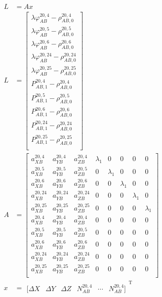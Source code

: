 \begin{align}
	L &= Ax \label{eq:21a} \\
	L &=
	\begin{bmatrix}
		\lambda \varphi_{AB}^{20,4}-\rho_{AB,0}^{20,4} \\[6pt]
		\lambda \varphi_{AB}^{20,5}-\rho_{AB,0}^{20,5} \\[6pt]
		\lambda \varphi_{AB}^{20,6}-\rho_{AB,0}^{20,6} \\[6pt]
		\lambda \varphi_{AB}^{20,24}-\rho_{AB,0}^{20,24} \\[6pt]
		\lambda \varphi_{AB}^{20,25}-\rho_{AB,0}^{20,25} \\[6pt]
		P_{AB,1}^{20,4}-\rho_{AB,0}^{20,4} \\[6pt]
		P_{AB,1}^{20,5}-\rho_{AB,0}^{20,5} \\[6pt]
		P_{AB,1}^{20,6}-\rho_{AB,0}^{20,6} \\[6pt]
		P_{AB,1}^{20,24}-\rho_{AB,0}^{20,24} \\[6pt]
		P_{AB,1}^{20,25}-\rho_{AB,0}^{20,25} \\
	\end{bmatrix} \label{eq:21b}\\
	A &= \left[\begin{matrix}
 a_{XB}^{20,4} &  a_{YB}^{20,4} &  a_{ZB}^{20,4} & \lambda_1 &         0 &         0 &         0 &         0\\[6pt]
 a_{XB}^{20,5} &  a_{YB}^{20,5} &  a_{ZB}^{20,5} &         0 & \lambda_1 &         0 &         0 &         0\\[6pt]
 a_{XB}^{20,6} &  a_{YB}^{20,6} &  a_{ZB}^{20,6} &         0 &         0 & \lambda_1 &         0 &         0\\[6pt]
a_{XB}^{20,24} & a_{YB}^{20,24} & a_{ZB}^{20,24} &         0 &         0 &         0 & \lambda_1 &         0\\[6pt]
a_{XB}^{20,25} & a_{YB}^{20,25} & a_{ZB}^{20,25} &         0 &         0 &         0 &         0 & \lambda_1\\[6pt]
 a_{XB}^{20,4} &  a_{YB}^{20,4} &  a_{ZB}^{20,4} &         0 &         0 &         0 &         0 &         0\\[6pt]
 a_{XB}^{20,5} &  a_{YB}^{20,5} &  a_{ZB}^{20,5} &         0 &         0 &         0 &         0 &         0\\[6pt]
 a_{XB}^{20,6} &  a_{YB}^{20,6} &  a_{ZB}^{20,6} &         0 &         0 &         0 &         0 &         0\\[6pt]
a_{XB}^{20,24} & a_{YB}^{20,24} & a_{ZB}^{20,24} &         0 &         0 &         0 &         0 &         0\\[6pt]
a_{XB}^{20,25} & a_{YB}^{20,25} & a_{ZB}^{20,25} &         0 &         0 &         0 &         0 &         0\\
\end{matrix}\right] \label{eq:21c} \\
x &= 
\begin{matrix}
	[\Delta X & \Delta Y & \Delta Z & N_{AB}^{20,4} & \cdots & N_{AB}^{20,4}]
\end{matrix}^{\text{T}}
\end{align}
